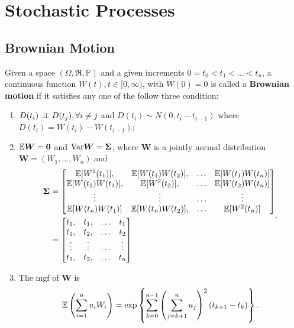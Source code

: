 \section{Stochastic Processes}

\subsection{Brownian Motion}
\begin{definition}
Given a space $(\Omega,\mathfrak{R},\mathbb{P})$ and a given increments $0=t_0<t_1<\dots<t_n$, a continuous function $W(t),t\in[0,\infty)$, with $W(0)=0$ is called a \textbf{Brownian motion} if it satisfies any one of the follow three condition:
\begin{enumerate}
\item $D(t_i)\perp\!\!\!\perp D(t_j),\forall i\ne j$ and $D(t_i)\sim N(0,t_i-t_{i-1})$ where $D(t_i)=W(t_i)-W(t_{i-1})$;
\item $\mathbb{E} \boldsymbol{W} = \boldsymbol{0}$ and $\text{Var} \boldsymbol{W}=\boldsymbol{\Sigma}$, where $\boldsymbol{W}$ is a jointly normal distribution $\boldsymbol{W}=(W_1,\dots,W_n)$ and
\begin{equation}
\begin{aligned}
\boldsymbol{\Sigma}&=
\begin{bmatrix}
\mathbb{E} [W^2(t_1)], & \mathbb{E}[W(t_1)W(t_2)],&\dots &\mathbb{E}[W(t_1)W(t_n)]\\
\mathbb{E}[W(t_2)W(t_1)], &\mathbb{E} [W^2(t_2)], &\dots&\mathbb{E}[W(t_2)W(t_n)]\\
\vdots &\vdots &\dots & \vdots\\
\mathbb{E} [W(t_n)W(t_1)] &\mathbb{E}[W(t_n)W(t_2)], &\dots & \mathbb{E}[W^2(t_n)]
\end{bmatrix}\\
&=
\begin{bmatrix}
t_1, & t_1, &\dots & t_1\\
t_1, & t_2, &\dots & t_2\\
\vdots & \vdots & \dots & \vdots\\
t_1, & t_2, &\dots & t_n
\end{bmatrix}
\label{eq:brownian_cov_matrix}
\end{aligned}.
\end{equation}
\item The mgf of $\boldsymbol{W}$ is
\begin{equation}
\mathbb{E} \left(\sum_{i=1}^nu_iW_i\right)=\exp\left\{\sum_{k=0}^{n-1}\left(\sum_{j=k+1}^nu_j\right)^2(t_{k+1}-t_{k})\right\}.
\end{equation}
\end{enumerate}
\end{definition}

